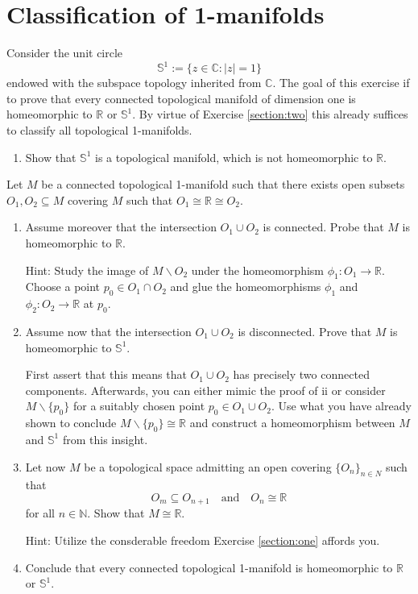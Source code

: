 \documentclass{article}
\begin{document}
\section{Classification of 1-manifolds}

Consider the unit circle $$\mathbb{S}^{1}:=\{z\in\mathbb{C}:|z|=1\}$$ endowed with the subspace topology inherited from $\mathbb{C}$. The goal of this exercise if to prove that every connected topological manifold of dimension one is homeomorphic to $\mathbb{R}$ or $\mathbb{S}^{1}$. By virtue of Exercise \ref{section:two} this already suffices to classify all topological 1-manifolds.

\begin{enumerate}[label=\roman*.]
  \item Show that $\mathbb{S}^{1}$ is a topological manifold, which is not homeomorphic to $\mathbb{R}$.
\end{enumerate}

Let $M$ be a connected topological 1-manifold such that there exists open subsets $O_{1}, O_{2}\subseteq M$ covering $M$ such that $O_{1}\cong\mathbb{R}\cong O_{2}$.

\begin{enumerate}[label=\roman*., start=3]
  \item Assume moreover that the intersection $O_{1}\cup O_{2}$ is connected. Probe that $M$ is homeomorphic to $\mathbb{R}$.

  {\footnotesize Hint: Study the image of $M\backslash O_{2}$ under the homeomorphism $\phi_{1}:O_{1}\rightarrow\mathbb{R}$. Choose a point $p_{0}\in O_{1}\cap O_{2}$ and glue the homeomorphisms $\phi_{1}$ and $\phi_{2}:O_{2}\rightarrow\mathbb{R}$ at $p_{0}$.} 

  \item Assume now that the intersection $O_{1}\cup O_{2}$ is disconnected. Prove that $M$ is homeomorphic to $\mathbb{S}^{1}$.

  {\footnotesize First assert that this means that $O_{1}\cup O_{2}$ has precisely two connected components. Afterwards, you can either mimic the proof of ii or consider $M\backslash\{p_{0}\}$ for a suitably chosen point $p_{0}\in O_{1}\cup O_{2}$. Use what you have already shown to conclude $M\backslash\{p_{0}\}\cong\mathbb{R}$ and construct a homeomorphism between $M$ and $\mathbb{S}^{1}$ from this insight.}

  \item Let now $M$ be a topological space admitting an open covering $\{O_{n}\}_{n\in N}$ such that $$O_{m}\subseteq O_{n+1}\quad\text{and}\quad O_{n}\cong\mathbb{R}$$ for all $n\in\mathbb{N}$. Show that $M\cong\mathbb{R}$.

  {\footnotesize Hint: Utilize the consderable freedom Exercise \ref{section:one} affords you.}

  \item Conclude that every connected topological 1-manifold is homeomorphic to $\mathbb{R}$ or $\mathbb{S}^{1}$.
\end{enumerate}
\end{document}
